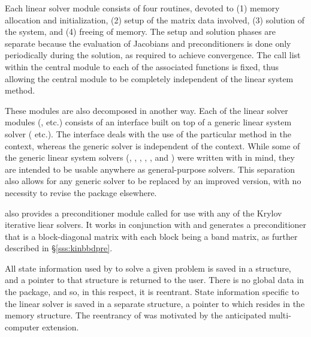 Each {\kinsol} linear solver module consists of four routines, devoted to (1)
memory allocation and initialization, (2) setup of the matrix data
involved, (3) solution of the system, and (4) freeing of memory.
The setup and solution phases are separate because the evaluation of
Jacobians and preconditioners is done only periodically during the
solution, as required to achieve convergence. The call list within
the central {\kinsol} module to each of the associated functions is
fixed, thus allowing the central module to be completely independent
of the linear system method.

These modules are also decomposed in another way.
Each of the linear solver modules ({\kindense}, etc.) consists of an
interface built on top of a generic linear system solver ({\dense}
etc.).  The interface deals with the use of the particular method in
the {\kinsol} context, whereas the generic solver is independent of
the context.  While some of the generic linear system solvers
({\dense}, {\band}, {\spgmr}, {\spfgmr}, {\spbcg}, and {\sptfqmr}) were written
with {\sundials} in mind, they are intended to be usable anywhere as
general-purpose solvers.  This separation also allows for any generic
solver to be replaced by an improved version, with no necessity to
revise the {\kinsol} package elsewhere. 

{\kinsol} also provides a preconditioner module called {\kinbbdpre} for use
with any of the Krylov iterative liear solvers. It works in conjunction
with {\nvecp} and generates a preconditioner that is
a block-diagonal matrix with each block being a band matrix, as
further described in \S\ref{sss:kinbbdpre}.

All state information used by {\kinsol} to solve a given problem is saved
in a structure, and a pointer to that structure is returned to the
user.  There is no global data in the {\kinsol} package, and so, in this
respect, it is reentrant. State information specific to the linear
solver is saved in a separate structure, a pointer to which resides in
the {\kinsol} memory structure. The reentrancy of {\kinsol} was motivated
by the anticipated multi-computer extension.
